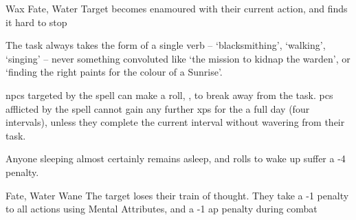   {}%
  {Wax}%
  {Fate, Water}%
  {}%
  {Target becomes enamoured with their current action, and finds it hard to stop}%
  {
    The task always takes the form of a single verb -- `blacksmithing', `walking', `singing' -- never something convoluted like `the mission to kidnap the warden', or `finding the right paints for the colour of a Sunrise'.

    \Glspl{npc} targeted by the spell can make a  roll, \tn[8], to break away from the task.
    \Glspl{pc} afflicted by the spell cannot gain any further \glspl{xp} for the a full day (four \glspl{interval}), unless they complete the current \gls{interval} without wavering from their task.

  Anyone sleeping almost certainly remains asleep, and rolls to wake up suffer a -4 penalty.}

  {Fate, Water}%
  {Wane}%
  {}%
  {}%
  {The target loses their train of thought.
    They take a -1 penalty to all actions using Mental Attributes, and a -1 \gls{ap} penalty during combat}%
  {}

